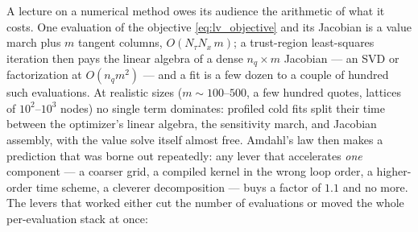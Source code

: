 \documentclass[11pt]{article}
\begin{document}
A lecture on a numerical method owes its audience the arithmetic of what
it costs.  One evaluation of the objective \eqref{eq:lv_objective} and its
Jacobian is a value march plus $m$ tangent columns,
$O(N_\tau N_x\,m)$; a trust-region least-squares iteration then pays the
linear algebra of a dense $n_q\times m$ Jacobian --- an SVD or
factorization at $O(n_q m^{2})$ --- and a fit is a few dozen to a couple
of hundred such evaluations.  At realistic sizes ($m\sim100$--$500$, a few
hundred quotes, lattices of $10^{2}$--$10^{3}$ nodes) no single term
dominates: profiled cold fits split their time between the optimizer's
linear algebra, the sensitivity march, and Jacobian assembly, with the
value solve itself almost free.  Amdahl's law then makes a prediction that
was borne out repeatedly: any lever that accelerates \emph{one} component
--- a coarser grid, a compiled kernel in the wrong loop order, a
higher-order time scheme, a cleverer decomposition --- buys a factor of
$1.1$ and no more.  The levers that worked either cut the number of
evaluations or moved the whole per-evaluation stack at once:
\end{document}
